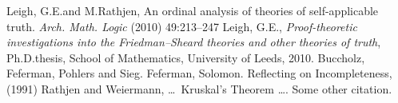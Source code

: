 \documentclass[UKenglish,cleveref,DIV=12]{scrartcl}
\theoremstyle{definition}
\theoremstyle{definition}
\begin{document}

\begin{thebibliography}{10}
	 Leigh, G.E.\@ and M.\@ Rathjen, An ordinal analysis of theories of self-applicable truth. \emph{Arch. Math. Logic} (2010) 49:213–247
	 Leigh, G.E., \emph{Proof-theoretic investigations into the Friedman--Sheard theories and other theories of truth}, Ph.D.\@ thesis, School of Mathematics, University of Leeds, 2010.
	 Buccholz, Feferman, Pohlers and Sieg.
	 Feferman, Solomon. Reflecting on Incompleteness, (1991)
	 Rathjen and Weiermann, \dots\ Kruskal's Theorem \dots.
	 Some other citation.
\end{thebibliography}

\end{document}

